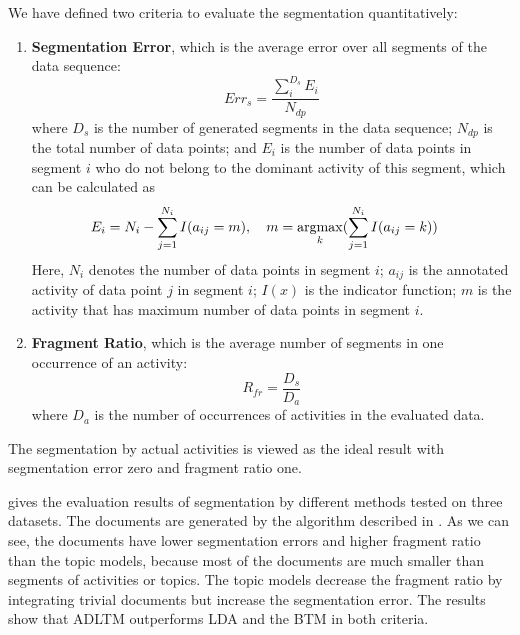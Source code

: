 \documentclass{article}
\newcommand{\argmax}{\operatornamewithlimits{argmax}}
\begin{document}
\newcommand{\fracii}[2]{\ensuremath{#1/#2}}
We have defined two criteria to evaluate the segmentation quantitatively:
\begin{enumerate}
\item  \textbf{Segmentation Error}, which is the average error over all segments of the data sequence:
\begin{equation*} %
Err_{s} = \frac{\sum_i^{D_{s}} E_{i}}{N_{dp}}
\end{equation*}
%
where $D_s$ is the number of generated segments in the data sequence; 
$N_{dp}$ is the total number of data points; and 
$E_i$ is the number of data points in segment $i$ who do not belong to the dominant activity of this segment, which can be calculated as
\begin{equation*} \label{eq:seg2}
\begin{split}
E_i &= N_i - \sum_{j=1}^{N_i} I(a_{ij} = m),\ \ \
m = \argmax_k(\sum_{j=1}^{N_i} I(a_{ij} = k))
\end{split}
\end{equation*}
Here, $N_i$ denotes the number of data points in segment $i$; 
$a_{ij}$ is the annotated activity of data point $j$ in segment $i$; 
$I(x)$ is the indicator function; 
$m$ is the activity that has maximum number of data points in segment $i$. 
\item \textbf{Fragment Ratio}, which is the average number of segments in one occurrence of an activity:
\begin{equation*} %
R_{fr} = \frac{D_{s}}{D_{a}}
\end{equation*}
where 
$D_{a}$ is the number of occurrences of activities in the evaluated data. 
\end{enumerate}
The segmentation by actual activities is viewed as the ideal result with segmentation error zero and fragment ratio one. 

 gives the evaluation results of segmentation by different methods tested on three datasets. 
The documents are generated by the algorithm described in \Cref{alg:segmentation}. As we can see, the documents have lower segmentation errors and higher fragment ratio than the topic models, because most of the documents are much smaller than segments of activities or topics. The topic models decrease the fragment ratio by integrating trivial documents but increase the segmentation error. 
The results show that \ac{ADLTM} outperforms \ac{LDA} \cite{blei2003latent} and the \ac{BTM} \cite{wallach2006topic} in both criteria.
\end{document}
